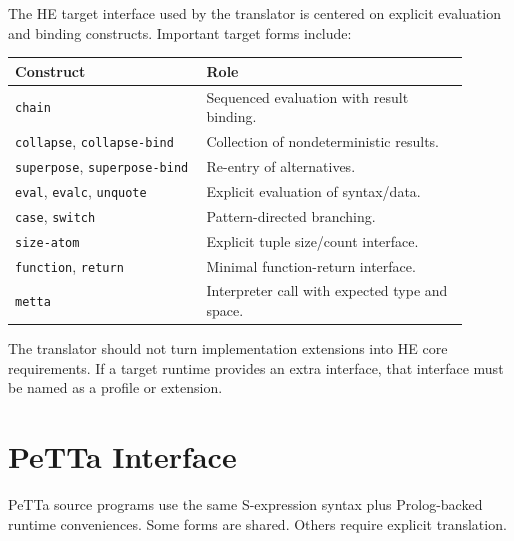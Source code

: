 \documentclass[11pt]{article}
\newcommand{\code}[1]{\texttt{#1}}
\newcommand{\HE}{\textup{HE}}
\newcommand{\PeTTa}{\textup{PeTTa}}
\begin{document}
The \HE{} target interface used by the translator is centered on explicit
evaluation and binding constructs.  Important target forms include:
\begin{center}
\begin{tabular}{p{0.38\linewidth}p{0.52\linewidth}}
\toprule
Construct & Role \\
\midrule
\code{chain} & Sequenced evaluation with result binding. \\
\code{collapse}, \code{collapse-bind} & Collection of nondeterministic results. \\
\code{superpose}, \code{superpose-bind} & Re-entry of alternatives. \\
\code{eval}, \code{evalc}, \code{unquote} & Explicit evaluation of syntax/data. \\
\code{case}, \code{switch} & Pattern-directed branching. \\
\code{size-atom} & Explicit tuple size/count interface. \\
\code{function}, \code{return} & Minimal function-return interface. \\
\code{metta} & Interpreter call with expected type and space. \\
\bottomrule
\end{tabular}
\end{center}

The translator should not turn implementation extensions into \HE{} core
requirements.  If a target runtime provides an extra interface, that interface must
be named as a profile or extension.

\section{\PeTTa{} Interface}

\PeTTa{} source programs use the same S-expression syntax plus Prolog-backed
runtime conveniences.  Some forms are shared.  Others require explicit
translation.
\end{document}
